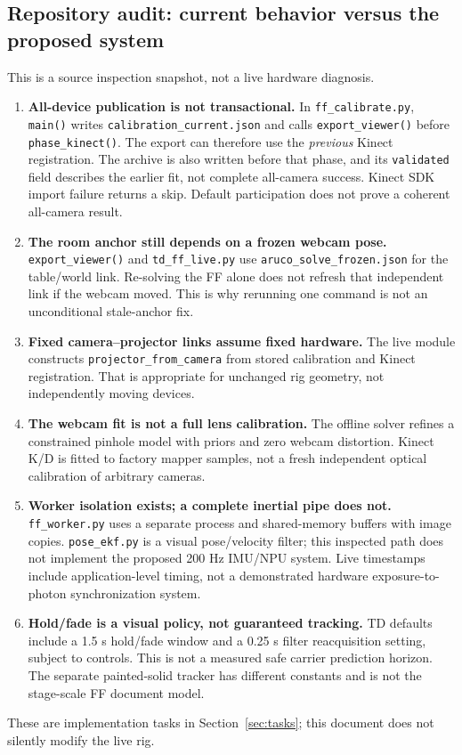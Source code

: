 \documentclass[11pt,a4paper]{article}
\begin{document}
\subsection{Repository audit: current behavior versus the proposed system}
\label{sec:repoaudit}
This is a source inspection snapshot, not a live hardware diagnosis.
\begin{enumerate}
  \item \textbf{All-device publication is not transactional.}
    In \texttt{ff\_calibrate.py}, \texttt{main()} writes
    \texttt{calibration\_current.json} and calls \texttt{export\_viewer()}
    before \texttt{phase\_kinect()}. The export can therefore use the
    \emph{previous} Kinect registration. The archive is also written before
    that phase, and its \texttt{validated} field describes the earlier fit,
    not complete all-camera success. Kinect SDK import failure returns a skip.
    Default participation does not prove a coherent all-camera result.
  \item \textbf{The room anchor still depends on a frozen webcam pose.}
    \texttt{export\_viewer()} and \texttt{td\_ff\_live.py} use
    \texttt{aruco\_solve\_frozen.json} for the table/world link. Re-solving
    the FF alone does not refresh that independent link if the webcam moved.
    This is why rerunning one command is not an unconditional stale-anchor fix.
  \item \textbf{Fixed camera--projector links assume fixed hardware.}
    The live module constructs \texttt{projector\_from\_camera} from stored
    calibration and Kinect registration. That is appropriate for unchanged
    rig geometry, not independently moving devices.
  \item \textbf{The webcam fit is not a full lens calibration.}
    The offline solver refines a constrained pinhole model with priors and
    zero webcam distortion. Kinect K/D is fitted to factory mapper samples,
    not a fresh independent optical calibration of arbitrary cameras.
  \item \textbf{Worker isolation exists; a complete inertial pipe does not.}
    \texttt{ff\_worker.py} uses a separate process and shared-memory buffers
    with image copies. \texttt{pose\_ekf.py} is a visual pose/velocity filter;
    this inspected path does not implement the proposed 200 Hz IMU/NPU system.
    Live timestamps include application-level timing, not a demonstrated
    hardware exposure-to-photon synchronization system.
  \item \textbf{Hold/fade is a visual policy, not guaranteed tracking.}
    TD defaults include a 1.5 s hold/fade window and a 0.25 s filter
    reacquisition setting, subject to controls. This is not a measured
    safe carrier prediction horizon. The separate painted-solid tracker
    has different constants and is not the stage-scale FF document model.
\end{enumerate}
These are implementation tasks in Section~\ref{sec:tasks}; this document
does not silently modify the live rig.
\end{document}
